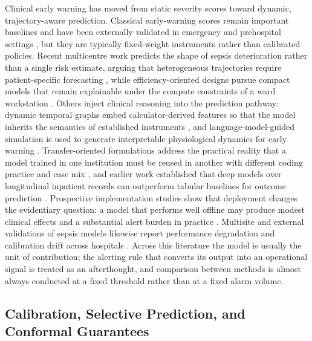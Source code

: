 Clinical early warning has moved from static severity scores toward dynamic, trajectory-aware prediction. Classical early-warning scores remain important baselines and have been externally validated in emergency and prehospital settings \citep{candel2023development,goodacre2023prehospital}, but they are typically fixed-weight instruments rather than calibrated policies. Recent multicentre work predicts the shape of sepsis deterioration rather than a single risk estimate, arguing that heterogeneous trajectories require patient-specific forecasting \citep{xiumin2026machine}, while efficiency-oriented designs pursue compact models that remain explainable under the compute constraints of a ward workstation \citep{taparugssanagorn2026lightweight}. Others inject clinical reasoning into the prediction pathway: dynamic temporal graphs embed calculator-derived features so that the model inherits the semantics of established instruments \citep{yin2024sepsiscalc}, and language-model-guided simulation is used to generate interpretable physiological dynamics for early warning \citep{nie2026clinically}. Transfer-oriented formulations address the practical reality that a model trained in one institution must be reused in another with different coding practice and case mix \citep{komolafe2025early}, and earlier work established that deep models over longitudinal inpatient records can outperform tabular baselines for outcome prediction \citep{rong2025deep,yong2024deep,mohammad2024early}. Prospective implementation studies show that deployment changes the evidentiary question: a model that performs well offline may produce modest clinical effects and a substantial alert burden in practice \citep{adams2022prospective}. Multisite and external validations of sepsis models likewise report performance degradation and calibration drift across hospitals \citep{valan2025evaluating,ostermayer2024external,wong2021external,wong2026multicenter}. Across this literature the model is usually the unit of contribution; the alerting rule that converts its output into an operational signal is treated as an afterthought, and comparison between methods is almost always conducted at a fixed threshold rather than at a fixed alarm volume.

\subsection{Calibration, Selective Prediction, and Conformal Guarantees}

